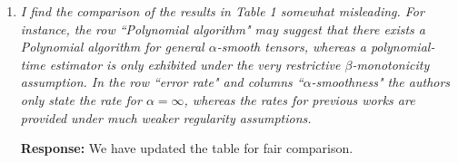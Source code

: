 \documentclass[11pt]{article}
\theoremstyle{plain}
\theoremstyle{definition}
\begin{document}
\begin{enumerate}[wide, labelwidth=!, labelindent=0pt]
    \item \textit{I find the comparison of the results in Table 1 somewhat misleading. For instance, the row ``Polynomial algorithm" may suggest that there exists a Polynomial algorithm for general $\alpha$-smooth tensors, whereas a polynomial-time estimator is only exhibited under the very restrictive $\beta$-monotonicity assumption. In the row ``error rate" and columns ``$\alpha$-smoothness" the authors only state the rate for $\alpha=\infty$, whereas the rates for previous works are provided under much weaker regularity assumptions.}
    
    {\bf Response:} We have updated the table for fair comparison. 
    
    
 \begin{table}[h]
    \centering
    \caption{Comparison of our results with previous work. For simplicity, we omit the log term in the rate. \color{blue}$^{*}$Optimality is achieved under extra Lipchitz monotonicity conditions. }\label{tab:comp}
\end{table}


\end{enumerate}
\end{document}

